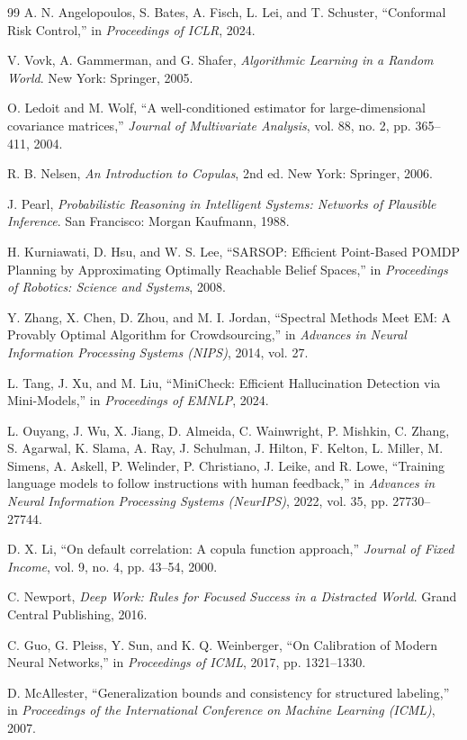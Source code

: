 \documentclass[12pt,a4paper]{report}
\begin{document}
\begin{thebibliography}{99}
A. N. Angelopoulos, S. Bates, A. Fisch, L. Lei, and T. Schuster, ``Conformal Risk Control,'' in \textit{Proceedings of ICLR}, 2024.

V. Vovk, A. Gammerman, and G. Shafer, \textit{Algorithmic Learning in a Random World}. New York: Springer, 2005.

O. Ledoit and M. Wolf, ``A well-conditioned estimator for large-dimensional covariance matrices,'' \textit{Journal of Multivariate Analysis}, vol. 88, no. 2, pp. 365--411, 2004.

R. B. Nelsen, \textit{An Introduction to Copulas}, 2nd ed. New York: Springer, 2006.

J. Pearl, \textit{Probabilistic Reasoning in Intelligent Systems: Networks of Plausible Inference}. San Francisco: Morgan Kaufmann, 1988.

H. Kurniawati, D. Hsu, and W. S. Lee, ``SARSOP: Efficient Point-Based POMDP Planning by Approximating Optimally Reachable Belief Spaces,'' in \textit{Proceedings of Robotics: Science and Systems}, 2008.

Y. Zhang, X. Chen, D. Zhou, and M. I. Jordan, ``Spectral Methods Meet EM: A Provably Optimal Algorithm for Crowdsourcing,'' in \textit{Advances in Neural Information Processing Systems (NIPS)}, 2014, vol. 27.

L. Tang, J. Xu, and M. Liu, ``MiniCheck: Efficient Hallucination Detection via Mini-Models,'' in \textit{Proceedings of EMNLP}, 2024.

L. Ouyang, J. Wu, X. Jiang, D. Almeida, C. Wainwright, P. Mishkin, C. Zhang, S. Agarwal, K. Slama, A. Ray, J. Schulman, J. Hilton, F. Kelton, L. Miller, M. Simens, A. Askell, P. Welinder, P. Christiano, J. Leike, and R. Lowe, ``Training language models to follow instructions with human feedback,'' in \textit{Advances in Neural Information Processing Systems (NeurIPS)}, 2022, vol. 35, pp. 27730--27744.

D. X. Li, ``On default correlation: A copula function approach,'' \textit{Journal of Fixed Income}, vol. 9, no. 4, pp. 43--54, 2000.

C. Newport, \textit{Deep Work: Rules for Focused Success in a Distracted World}. Grand Central Publishing, 2016.

C. Guo, G. Pleiss, Y. Sun, and K. Q. Weinberger, ``On Calibration of Modern Neural Networks,'' in \textit{Proceedings of ICML}, 2017, pp. 1321--1330.

D. McAllester, ``Generalization bounds and consistency for structured labeling,'' in \textit{Proceedings of the International Conference on Machine Learning (ICML)}, 2007.

\end{thebibliography}
\end{document}
